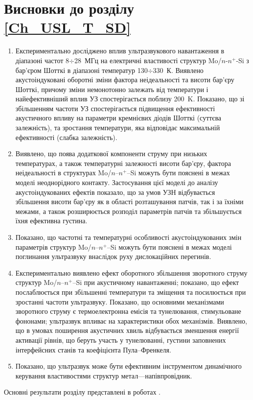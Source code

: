 \section*{Висновки до розділу \ref{Ch_USL_T_SD}}
  \begin{enumerate}[leftmargin=0cm,itemindent=3em]
     \item Експериментально досліджено вплив ультразвукового навантаження в діапазоні частот 8$\div$28~МГц на електричні властивості структур Mo/$n$-$n^{+}$-Si з бар'єром Шотткі в діапазоні температур 130$\div$330~К.
 Виявлено акустоіндуковані оборотні зміни фактора неідеальності та висоти бар'єру Шотткі, причому зміни немонотонно залежать від температури і найефективніший вплив УЗ спостерігається поблизу 200~K.
  Показано, що зі збільшенням частоти УЗ  спостерігається підвищення ефективності акустичного впливу на параметри кремнієвих діодів Шотткі (суттєва залежність),
та зростання температури, яка відповідає максимальній ефективності (слабка залежність).



\item Виявлено, що поява додаткової компоненти струму при низьких температурах, а також температурні залежності висоти бар'єру, фактора неідеальності в структурах Mo/$n$--$n^{+}$--Si можуть бути пояснені в межах моделі неоднорідного контакту.
    Застосування цієї моделі до аналізу акустоіндукованих ефектів показало, що
 за умов УЗН відбувається збільшення висоти бар'єру як в області розташування патчів, так і за їхніми межами, а також розширюється розподіл параметрів патчів та збільшується їхня ефективна густина.


\item Показано, що частотні та температурні особливості акустоіндукованих змін параметрів структур Mo/$n$--$n^{+}$--Si можуть бути пояснені в межах
 моделі поглинання ультразвуку внаслідок руху дислокаційних перегинів.



\item Експериментально виявлено ефект оборотного збільшення зворотного струму структур Mo/$n$--$n^{+}$--Si при акустичному навантаженні;
показано, що ефект послаблюється при збільшенні температури та зміщення та посилюється при зростанні частоти ультразвуку.
Показано, що основними механізмами зворотного струму є термоелектронна емісія та тунелювання, стимульоване фононами;
ультразвук впливає на характеристики обох механізмів.
 Виявлено, що в умовах поширення акустичних хвиль відбувається зменшення енергії активації рівнів, що беруть участь у тунелюванні,
густини заповнених інтерфейсних станів та коефіцієнта Пула--Френкеля.

\item Показано, що ультразвук може бути ефективним інструментом динамічного керування властивостями структур метал---напівпровідник.

  \end{enumerate}	

Основні результати розділу представлені в роботах \cite{Olikh:UPJ2014,OlikhJAP,Olikh:Ultras2016,Olikh2016JSem,
8Drog,2014IUSOl,2015ICU,7UNCPS}.
